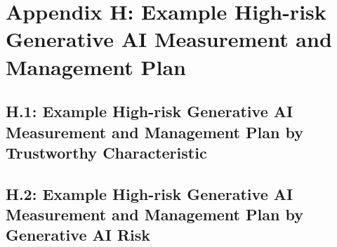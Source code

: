 \documentclass[fleqn]{article}
\begin{document}
\section*{Appendix H: Example High-risk Generative AI Measurement and Management Plan}\label{sec:appndxh}

\subsection*{H.1: Example High-risk Generative AI Measurement and Management Plan by Trustworthy Characteristic}\label{appdxh1}

\subsection*{H.2: Example High-risk Generative AI Measurement and Management Plan by Generative AI Risk}\label{appdxh2}
\end{document}

